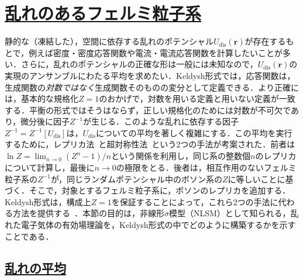 \documentclass[a4paper,11pt]{ltjsarticle}
\newcommand{\sectionlink}[1]{\section[#1]{\hyperlink{toc}{#1}}}
\newcommand{\subsectionlink}[1]{\subsection[#1]{\hyperlink{toc}{#1}}}
\begin{document}

\sectionlink{乱れのあるフェルミ粒子系}\label{sec_NLSM}



静的な（凍結した），空間に依存する乱れのポテンシャル$U_{\mathrm{dis}}(\mathbf{r})$が存在するもとで，例えば密度・密度応答関数や電流・電流応答関数を計算したいことが多い．さらに，乱れのポテンシャルの正確な形は一般には未知なので，$U_{\mathrm{dis}}(\mathbf{r})$の実現のアンサンブルにわたる平均を求めたい．Keldysh形式では，応答関数は，生成関数の{\em 対数ではなく}生成関数そのものの変分として定義できる．より正確には，基本的な規格化$Z=1$のおかげで，対数を用いる定義と用いない定義が一致する．平衡の形式ではそうはならず，正しい規格化のためには対数が不可欠であり，微分後に因子$Z^{-1}$が生じる．このような乱れに依存する因子$Z^{-1}=Z^{-1}[U_{\mathrm{dis}}]$は，$U_{\mathrm{dis}}$についての平均を著しく複雑にする．この平均を実行するために，レプリカ法~\cite{Edwards:1975aas,Wegner,EfetovLarkinKhmelnitskii,Finkel'stein,Belitz:1994zz}と超対称性法~\cite{Efetov:1983xg,Efetov:1997fw}という2つの手法が考案された．前者は$\ln Z=\lim_{n\to 0}(Z^n-1)/n$という関係を利用し，同じ系の整数個$n$のレプリカについて計算し，最後に$n\to 0$の極限をとる．後者は，相互作用のないフェルミ粒子系の$Z^{-1}$が，同じランダムポテンシャル中のボソン系の$Z$に等しいことに基づく．そこで，対象とするフェルミ粒子系に，ボソンのレプリカを追加する．Keldysh形式は，構成上$Z=1$を保証することによって，これら2つの手法に代わる方法を提供する~\cite{HorbachSchon,Kamenev:1999zza,Chamon:1999zz}．本節の目的は，非線形$\sigma$模型（NLSM）として知られる，乱れた電子気体の有効場理論を，Keldysh形式の中でどのように構築するかを示すことである．



\subsectionlink{乱れの平均}\label{sec_NLSM-1}
\end{document}
